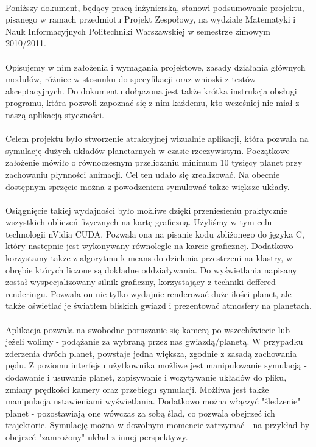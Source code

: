 \paragraph{}
Poniższy dokument, będący pracą inżynierską, stanowi podsumowanie projektu, pisanego w ramach przedmiotu Projekt Zespołowy, na wydziale Matematyki i Nauk Informacyjnych Politechniki Warszawskiej w semestrze zimowym 2010/2011.

\paragraph{}
Opisujemy w nim założenia i wymagania projektowe, zasady działania głównych modułów, różnice w stosunku do specyfikacji oraz wnioski z testów akceptacyjnych. Do dokumentu dołączona jest także krótka instrukcja obsługi programu, która pozwoli zapoznać się z nim każdemu, kto wcześniej nie miał z naszą aplikacją styczności.

\paragraph{}
Celem projektu było stworzenie atrakcyjnej wizualnie aplikacji, która pozwala na symulację dużych układów planetarnych w czasie rzeczywistym. Początkowe założenie mówiło o równoczesnym przeliczaniu minimum 10 tysięcy planet przy zachowaniu płynności animacji. Cel ten udało się zrealizować. Na obecnie dostępnym sprzęcie można z powodzeniem symulować także większe układy.

\paragraph{}
Osiągnięcie takiej wydajności było możliwe dzięki przeniesieniu praktycznie wszystkich obliczeń fizycznych na kartę graficzną. Użyliśmy w tym celu technologii nVidia CUDA\cite{cuda}. Pozwala ona na pisanie kodu zbliżonego do języka C, który następnie jest wykonywany równolegle na karcie graficznej. Dodatkowo korzystamy także z algorytmu k-means do dzielenia przestrzeni na klastry, w obrębie których liczone są dokładne oddziaływania. Do wyświetlania napisany został wyspecjalizowany silnik graficzny, korzystający z techniki deffered renderingu. Pozwala on nie tylko wydajnie renderować duże ilości planet, ale także oświetlać je światłem bliskich gwiazd i prezentować atmosfery na planetach.

\paragraph{}
Aplikacja pozwala na swobodne poruszanie się kamerą po wszechświecie lub - jeżeli wolimy - podążanie za wybraną przez nas gwiazdą/planetą. W przypadku zderzenia dwóch planet, powstaje jedna większa, zgodnie z zasadą zachowania pędu. Z poziomu interfejsu użytkownika możliwe jest manipulowanie symulacją - dodawanie i usuwanie planet, zapisywanie i wczytywanie układów do pliku, zmiany prędkości kamery oraz przebiegu symulacji. Możliwa jest także manipulacja ustawieniami wyświetlania. Dodatkowo można włączyć "śledzenie" planet - pozostawiają one wówczas za sobą ślad, co pozwala obejrzeć ich trajektorie. Symulację można w dowolnym momencie zatrzymać - na przykład by obejrzeć "zamrożony" układ z innej perspektywy.
